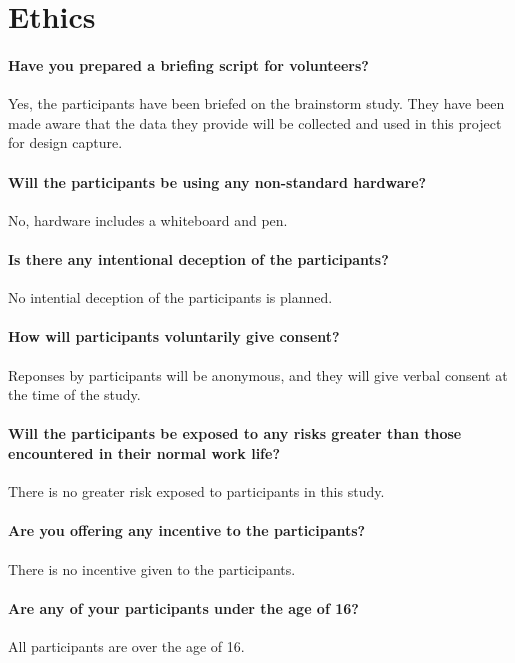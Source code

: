 \chapter{Ethics}\label{chap:ethics}

\subsubsection{Have you prepared a briefing script for volunteers?}
Yes, the participants have been briefed on the brainstorm study. They have been made aware that the data they provide will be collected and used in this project for design capture.

\subsubsection{Will the participants be using any non-standard hardware?}
No, hardware includes a whiteboard and pen.

\subsubsection{Is there any intentional deception of the participants?}
No intential deception of the participants is planned.

\subsubsection{How will participants voluntarily give consent?}
Reponses by participants will be anonymous, and they will give verbal consent at the time of the study.

\subsubsection{Will the participants be exposed to any risks greater than those encountered in their normal work life?}
There is no greater risk exposed to participants in this study.

\subsubsection{Are you offering any incentive to the participants?}
There is no incentive given to the participants.

\subsubsection{Are any of your participants under the age of 16?}
All participants are over the age of 16.

